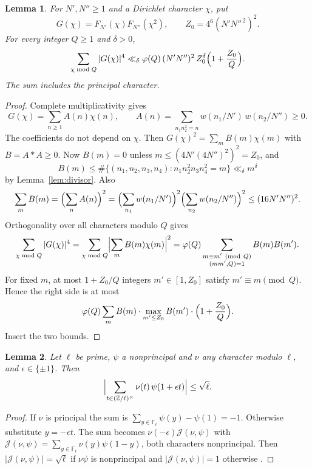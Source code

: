 \documentclass{amsart}
\newtheorem{lemma}{Lemma}[section]
\theoremstyle{definition}
\theoremstyle{plain}
\numberwithin{equation}{section}
\numberwithin{table}{section}
\begin{document}
\begin{lemma}\label{lem:pw:G4}
For $N',N''\ge1$ and a Dirichlet character $\chi$, put
\[
 G(\chi)=F_{N'}(\chi)F_{N''}(\chi^2),\qquad
 Z_0=4^6(N'N''^{\,2})^2.
\]
For every integer $Q\ge1$ and $\delta>0$,
\begin{equation}\label{eq:pw:G4}
 \sum_{\chi\bmod Q}|G(\chi)|^4\ll_\delta\varphi(Q)\,(N'N'')^2\,Z_0^{\delta}
 \Bigl(1+\frac {Z_0}Q\Bigr).
\end{equation}
The sum includes the principal character.
\end{lemma}

\begin{proof}
Complete multiplicativity gives
\[
 G(\chi)=\sum_{n\ge1}A(n)\chi(n),\qquad
 A(n)=\sum_{n_1n_2^2=n}w(n_1/N')\,w(n_2/N'')\ge0 .
\]
The coefficients do not depend on $\chi$. Then
$G(\chi)^2=\sum_mB(m)\chi(m)$ with $B=A*A\ge0$. Now
$B(m)=0$ unless $m\le(4N'(4N'')^2)^2=Z_0$, and
\[
 B(m)\le\#\{(n_1,n_2,n_3,n_4):n_1n_2^2n_3n_4^2=m\}\ll_\delta m^{\delta}
\]
by Lemma~\ref{lem:divisor}. Also
\[
 \sum_mB(m)=\Bigl(\sum_nA(n)\Bigr)^2
 =\Bigl(\sum_{n_1}w(n_1/N')\Bigr)^2\Bigl(\sum_{n_2}w(n_2/N'')\Bigr)^2\le(16N'N'')^2 .
\]
Orthogonality over all characters modulo $Q$ gives
\[
 \sum_{\chi\bmod Q}|G(\chi)|^4=\sum_{\chi\bmod Q}\Bigl|\sum_mB(m)\chi(m)\Bigr|^2
 =\varphi(Q)\sum_{\substack{m\equiv m'\ (\mathrm{mod}\ Q)\\(mm',Q)=1}}B(m)B(m').
\]
For fixed $m$, at most $1+Z_0/Q$ integers $m'\in[1,Z_0]$ satisfy
$m'\equiv m\pmod Q$. Hence the right side is at most
\[
 \varphi(Q)\sum_mB(m)\cdot\max_{m'\le Z_0}B(m')\cdot\Bigl(1+\frac {Z_0}Q\Bigr).
\]
Insert the two bounds.
\end{proof}

\begin{lemma}\label{lem:pw:jacobi}
Let $\ell$ be prime, $\psi$ a nonprincipal and $\nu$ any character modulo
$\ell$, and $\epsilon\in\{\pm1\}$. Then
\[
 \Bigl|\sum_{t\in(\mathbb Z/\ell)^\times}\nu(t)\,\psi(1+\epsilon t)\Bigr|\le\sqrt\ell .
\]
\end{lemma}

\begin{proof}
If $\nu$ is principal the sum is $\sum_{y\in\mathbb F_\ell}\psi(y)-\psi(1)=-1$.
Otherwise substitute $y=-\epsilon t$. The sum becomes
$\nu(-\epsilon)\mathcal J(\nu,\psi)$ with
$\mathcal J(\nu,\psi)=\sum_{y\in\mathbb F_\ell}\nu(y)\psi(1-y)$, both characters
nonprincipal. Then $|\mathcal J(\nu,\psi)|=\sqrt\ell$ if $\nu\psi$ is
nonprincipal and $|\mathcal J(\nu,\psi)|=1$ otherwise \cite[Ch.~8, \S3]{IR}.
\end{proof}
\end{document}
